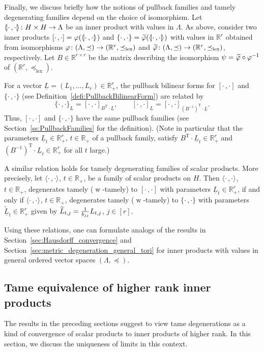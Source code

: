 \documentclass[AHL,Unicode,longabstracts]{cedram}
\newcommand{\innone}[2]{{\langle#2\rangle_{#1}}}
\newcommand{\llangle}{\mathopen{\langle\mkern -3.1mu\lvert}}
\newcommand{\rrangle}{\mathclose{\rvert\mkern -3.1mu\rangle}}
\newcommand{\highinn}[2]{{\llangle#2\rrangle_{#1}}}
\DeclareMathOperator{\weak}{w}
\newcommand{\R}{\mathbb{R}}
\newcommand{\transpose}{\mathrm{T}}
\newcommand{\lexeq}{\preceq_{\mathrm{lex}}}
\renewcommand*{\to}{\mathchoice{\longrightarrow}{\rightarrow}{\rightarrow}{\rightarrow}}
\let\oldtilde\tilde
\renewcommand*{\tilde}[1]{\mathchoice{\widetilde{#1}}{\widetilde{#1}}{\oldtilde{#1}}{\oldtilde{#1}}}
\begin{document}
Finally, we discuss briefly how the notions of pullback families and tamely degenerating families depend on the choice of isomorphism. Let $\highinn{}{\cdot \,, \cdot} \colon H \times H \to \Lambda$ be an inner product with values in $\Lambda$. As above, consider two inner products $[\cdot \,, \cdot] = \varphi (\highinn{}{\cdot \,, \cdot})$ and $\{\cdot \,, \cdot\} = \tilde \varphi(\highinn{}{\cdot \,, \cdot})$ with values in $\R^r$ obtained from isomorphisms $\varphi \colon (\Lambda, \preceq) \to (\R^r, \lexeq)$ and $\tilde \varphi \colon (\Lambda, \preceq) \to (\R^r, \lexeq)$, respectively. Let $B \in \R^{r \times r}$ be the matrix describing the isomorphism $\psi = \tilde \varphi \circ \varphi^{-1}$ of $(\R^r, \lexeq)$.

For a vector $\underline L = (L_1, \dots, L_r) \in \R_+^r $, the pullback bilinear forms for $[\cdot \,, \cdot]$ and $\{\cdot \,, \cdot\}$ (see Definition~\ref{defi:PullbackBilinearForm}) are related by
\[
\{\cdot \,, \cdot\}_{\underline L} = [\cdot \,, \cdot]_{B^\transpose \cdot \underline L}, \qquad [\cdot \,, \cdot]_{\underline L} = [\cdot \,, \cdot]_{(B^{-1})^\transpose \cdot \underline L}.
\]
Thus, $[\cdot \,, \cdot]$ and $\{\cdot \,, \cdot \}$ have the same pullback families (see Section~\ref{ss:PullbackFamilies} for the definition). (Note in particular that the parameters $\underline L_t \in \R_+^r$, $t \in \R_+$ of a pullback family, satisfy $B^\transpose \cdot \underline L_t \in \R_+^r$ and $(B^{-1})^\transpose \cdot \underline L_t \in\R_+^r$ for all $t$ large.)


A similar relation holds for tamely degenerating families of scalar products. More precisely, let $\innone{}{\cdot \,, \cdot}$, $t \in \R_+$, be a family of scalar products on $H$. Then $\innone{}{\cdot \,,\cdot}$, $t \in \R_+$, degenerates tamely ($\weak$-tamely) to $[\cdot \,, \cdot]$ with parameters $\underline L_t \in \R_+^r$, if and only if $\innone{}{\cdot \,, \cdot}$, $t \in \R_+$, degenerates tamely ($\weak$-tamely) to $\{\cdot \,, \cdot\}$ with parameters $\widetilde{\underline L}_t \in \R_+^ r$ given by $\tilde L_{t,j} = \frac{1}{b_{jj}} L_{t,j}$, $j \in [r]$.


Using these relations, one can formulate analogs of the results in Section~\ref{sec:Hausdorff_convergence} and Section~\ref{sec:metric_degeneration_general_tori} for inner products with values in general ordered vector spaces $(\Lambda, \preceq)$.



\subsection{Tame equivalence of higher rank inner products} \label{ss:TameEquivalence}
The results in the preceding sections suggest to view tame degenerations as a kind of convergence of scalar products to inner products of higher rank. In this section, we discuss the uniqueness of limits in this context.
\end{document}
